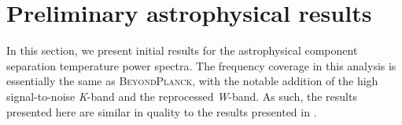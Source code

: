 \documentclass[twocolumn]{../../common/aa}
\newcommand{\bp}{\textsc{BeyondPlanck}}
\newcommand{\K}[0]{\textit K}
\newcommand{\W}[0]{\textit W}
\begin{document}


\section{Preliminary astrophysical results}
\label{sec:astrophysics}

In this section, we present initial results for the astrophysical component separation temperature power spectra. The frequency coverage in this analysis is essentially the same as \bp, with the notable addition of the high signal-to-noise \K-band and the reprocessed \W-band. As such, the results presented here are similar in quality to the results presented in \citet{bp01}.
\end{document}
